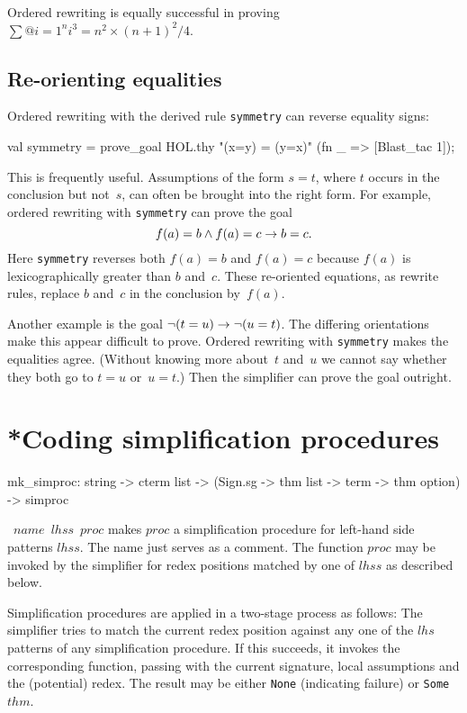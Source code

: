 Ordered rewriting is equally successful in proving
$\sum@{i=1}^n i^3 = n^2\times(n+1)^2/4$.


\subsection{Re-orienting equalities}
Ordered rewriting with the derived rule {\tt symmetry} can reverse equality
signs:
\begin{ttbox}
val symmetry = prove_goal HOL.thy "(x=y) = (y=x)"
                 (fn _ => [Blast_tac 1]);
\end{ttbox}
This is frequently useful.  Assumptions of the form $s=t$, where $t$ occurs
in the conclusion but not~$s$, can often be brought into the right form.
For example, ordered rewriting with {\tt symmetry} can prove the goal
\[ f(a)=b \wedge f(a)=c \rightarrow b=c. \]
Here {\tt symmetry} reverses both $f(a)=b$ and $f(a)=c$
because $f(a)$ is lexicographically greater than $b$ and~$c$.  These
re-oriented equations, as rewrite rules, replace $b$ and~$c$ in the
conclusion by~$f(a)$. 

Another example is the goal $\neg(t=u) \rightarrow \neg(u=t)$.
The differing orientations make this appear difficult to prove.  Ordered
rewriting with {\tt symmetry} makes the equalities agree.  (Without
knowing more about~$t$ and~$u$ we cannot say whether they both go to $t=u$
or~$u=t$.)  Then the simplifier can prove the goal outright.



\section{*Coding simplification procedures}
\begin{ttbox}
mk_simproc: string -> cterm list ->
              (Sign.sg -> thm list -> term -> thm option) -> simproc
\end{ttbox}

\begin{ttdescription}
\item[\ttindexbold{mk_simproc}~$name$~$lhss$~$proc$] makes $proc$ a
  simplification procedure for left-hand side patterns $lhss$.  The
  name just serves as a comment.  The function $proc$ may be invoked
  by the simplifier for redex positions matched by one of $lhss$ as
  described below.
\end{ttdescription}

Simplification procedures are applied in a two-stage process as
follows: The simplifier tries to match the current redex position
against any one of the $lhs$ patterns of any simplification procedure.
If this succeeds, it invokes the corresponding {\ML} function, passing
with the current signature, local assumptions and the (potential)
redex.  The result may be either \texttt{None} (indicating failure) or
\texttt{Some~$thm$}.

